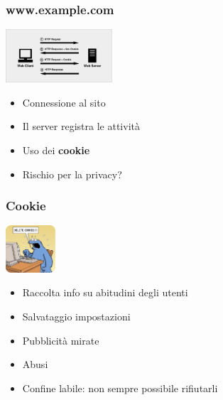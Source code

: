 \documentclass[xcolor=svgnames]{beamer}
\begin{document}
\begin{frame}
	\frametitle{www.example.com}

	\begin{block}{\includegraphics[width=150px]{img/request-response.png}}
			\begin{itemize}
						\pause
					\item Connessione al sito
						\pause
					\item Il server registra le attività
						\pause
					\item Uso dei {\bf cookie}
						\pause
					\item Rischio per la privacy?
			\end{itemize}
	\end{block}
\end{frame}

\begin{frame}
	\frametitle{Cookie}

	\begin{block}{\includegraphics[width=70px]{img/cookie.jpg}}
			\begin{itemize}
						\pause
					\item Raccolta info su abitudini degli utenti
						\pause
					\item Salvataggio impostazioni
						\pause
					\item Pubblicità mirate
						\pause
					\item Abusi
						\pause
					\item Confine labile: non sempre possibile rifiutarli
			\end{itemize}
	\end{block}
\end{frame}
\end{document}
